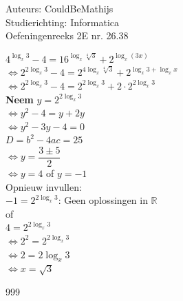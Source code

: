 \documentclass[a4paper]{article}
\begin{document}
  
\noindent \large Auteurs: CouldBeMathijs\\
\noindent \large Studierichting: Informatica\\
\noindent \large Oefeningenreeks 2E nr. 26.38\\

\medskip

\normalsize

$4^{\log_x 3} - 4 = 16^{\log_x \sqrt[4]{3}} + 2^{\log_x(3x)}$\\

$\Leftrightarrow 2^{2\log_x 3} - 4 = 2^{4\log_x \sqrt[4]{3}} + 2^{\log_x 3 + \log_x x}$\\

$\Leftrightarrow 2^{2\log_x 3} - 4 = 2^{2\log_x 3} + 2 \cdot 2^{2\log_x 3}$\\

\textbf{Neem} $y = 2^{2\log_x 3}$\\

$\Leftrightarrow y^2 - 4 = y + 2y$\\

$\Leftrightarrow y^2 -3y - 4 = 0$\\

$D = b^2 - 4ac = 25$\\

$\Leftrightarrow y = \dfrac{3\pm 5}{2}$\\

$\Leftrightarrow y = 4$ of $y = -1$\\

Opnieuw invullen:\\

$-1 = 2^{2\log_x 3}$: Geen oplossingen in $\mathbb{R}$\\

of\\

$4 = 2^{2\log_x 3}$\\

$\Leftrightarrow 2^2 = 2^{2\log_x 3}$\\

$\Leftrightarrow 2 = 2\log_x 3$\\

$\Leftrightarrow x = \sqrt{3}$


\begin{thebibliography}{999}
\end{thebibliography}
\end{document}
